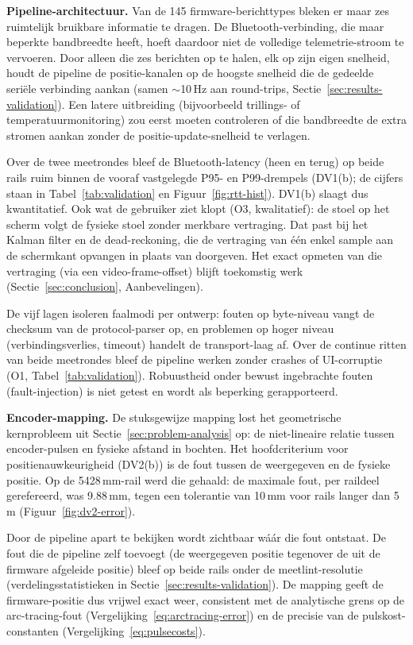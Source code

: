 \documentclass[10pt, a4paper, twocolumn]{article}
\begin{document}
\textbf{Pipeline-architectuur.}
Van de 145 firmware-berichttypes bleken er maar zes ruimtelijk bruikbare
informatie te dragen. De Bluetooth-verbinding, die maar beperkte bandbreedte
heeft, hoeft daardoor niet de volledige telemetrie-stroom te vervoeren. Door
alleen die zes berichten op te halen, elk op zijn eigen snelheid, houdt de
pipeline de positie-kanalen op de hoogste snelheid die de gedeelde seriële
verbinding aankan (samen $\sim$10\,Hz aan round-trips,
Sectie~\ref{sec:results-validation}). Een latere uitbreiding (bijvoorbeeld
trillings- of temperatuurmonitoring) zou eerst moeten controleren of die
bandbreedte de extra stromen aankan zonder de positie-update-snelheid te
verlagen.

Over de twee meetrondes bleef de Bluetooth-latency (heen en terug) op beide rails
ruim binnen de vooraf vastgelegde P95- en P99-drempels (DV1(b); de cijfers staan
in Tabel~\ref{tab:validation} en Figuur~\ref{fig:rtt-hist}). DV1(b) slaagt dus
kwantitatief. Ook wat de gebruiker
ziet klopt (O3, kwalitatief): de stoel op het scherm volgt de fysieke stoel
zonder merkbare vertraging. Dat past bij het Kalman filter en de dead-reckoning,
die de vertraging van één enkel sample aan de schermkant opvangen in plaats van
doorgeven. Het exact opmeten van die vertraging (via een video-frame-offset)
blijft toekomstig werk (Sectie~\ref{sec:conclusion}, Aanbevelingen).

De vijf lagen isoleren faalmodi per ontwerp: fouten op byte-niveau vangt de
checksum van de protocol-parser op, en problemen op hoger niveau
(verbindingsverlies, timeout) handelt de transport-laag af. Over de continue
ritten van beide meetrondes bleef de pipeline werken zonder crashes of
UI-corruptie (O1, Tabel~\ref{tab:validation}). Robuustheid onder bewust
ingebrachte fouten (fault-injection) is niet getest en wordt als beperking
gerapporteerd.

\textbf{Encoder-mapping.}
De stuksgewijze mapping lost het geometrische kernprobleem uit
Sectie~\ref{sec:problem-analysis} op: de niet-lineaire relatie tussen
encoder-pulsen en fysieke afstand in bochten. Het hoofdcriterium voor
positienauwkeurigheid (DV2(b)) is de fout tussen de weergegeven en de fysieke
positie. Op de 5428\,mm-rail werd die gehaald: de maximale fout, per raildeel
gerefereerd, was 9.88\,mm, tegen een tolerantie van 10\,mm voor rails langer dan 5\,m
(Figuur~\ref{fig:dv2-error}).

Door de pipeline apart te bekijken wordt zichtbaar wáár die fout ontstaat. De
fout die de pipeline zelf toevoegt (de weergegeven positie tegenover de uit de
firmware afgeleide positie) bleef op beide rails onder de meetlint-resolutie
(verdelingsstatistieken in Sectie~\ref{sec:results-validation}). De mapping geeft
de firmware-positie dus vrijwel exact weer, consistent met de analytische grens op
de arc-tracing-fout (Vergelijking~\ref{eq:arctracing-error}) en de precisie van de
pulskost-constanten (Vergelijking~\ref{eq:pulsecosts}).
\end{document}
